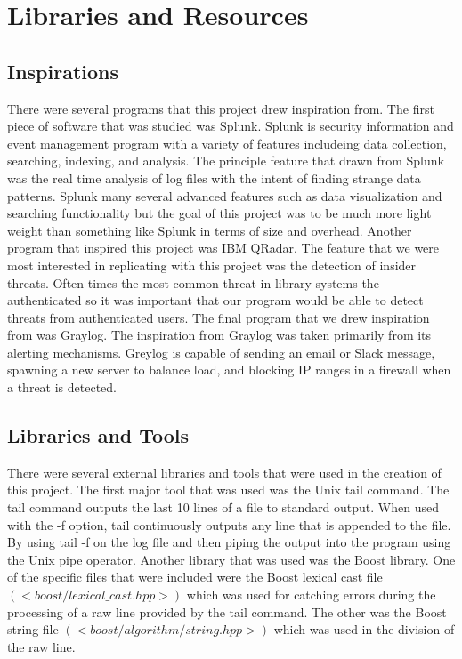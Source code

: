 \documentclass[12pt]{report}
\begin{document}
\section*{Libraries and Resources}

	\subsection*{Inspirations}
	There were several programs that this project drew inspiration from. The first 
	piece of software that was studied was Splunk. Splunk is security information
	and event management program with a variety of features includeing data collection,
	searching, indexing, and analysis. The principle feature that drawn from Splunk was
	the real time analysis of log files with the intent of finding strange data patterns.
	Splunk many several advanced features such as data visualization and searching
	functionality but the goal of this project was to be much more light weight than
	something like Splunk in terms of size and overhead. Another program that inspired 
	this project was IBM QRadar. The feature that we were most interested in replicating
	with this project was the detection of insider threats. Often times the most common 
	threat in library systems the authenticated so it was important that our program
	would be able to detect threats from authenticated users. The final program that we
	drew inspiration from was Graylog. The inspiration from Graylog was taken primarily
	from its alerting mechanisms. Greylog is capable of sending an email or Slack message,
	spawning a new server to balance load, and blocking IP ranges in a firewall when a 
	threat is detected.


	\subsection*{Libraries and Tools}
	There were several external libraries and tools that were used in the creation of 
	this project. The first major tool that was used was the Unix tail command. The tail
	command outputs the last 10 lines of a file to standard output. When used with the
	-f option, tail continuously outputs any line that is appended to the file. By using
	tail -f on the log file and then piping the output into the program using the Unix 
	pipe operator. Another library that was used was the Boost library. One of the specific
	files that were included were the Boost lexical cast file $(<boost/lexical\_cast.hpp>)$
	which was used for catching errors during the processing of a raw line provided 
	by the tail command. The other was the Boost string file $(<boost/algorithm/string.hpp>)$
	which was used in the division of the raw line.
\end{document}
